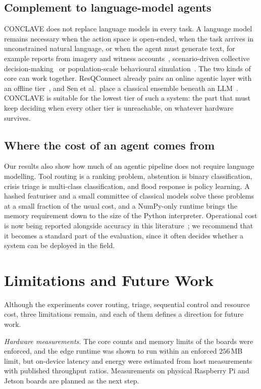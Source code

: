 \documentclass[journal]{IEEEtran}
\begin{document}
\subsection{Complement to language-model agents}
CONCLAVE does not replace language models in every task. A language model
remains necessary when the action space is open-ended, when the task arrives in
unconstrained natural language, or when the agent must generate text, for
example reports from imagery and witness
accounts~\cite{chen2026integration,pang2026reconstruction}, scenario-driven
collective decision-making~\cite{wang2025towards} or population-scale
behavioural simulation~\cite{sultimov2026respond}. The two kinds of core can
work together. ResQConnect already pairs an online agentic layer with an
offline tier~\cite{aththanayake2026resqconnect}, and Sen et al.\ place a
classical ensemble beneath an LLM~\cite{sen2026context}. CONCLAVE is suitable
for the lowest tier of such a system: the part that must keep deciding when
every other tier is unreachable, on whatever hardware survives.

\subsection{Where the cost of an agent comes from}
Our results also show how much of an agentic pipeline does not require
language modelling. Tool routing is a ranking problem, abstention is binary
classification, crisis triage is multi-class classification, and flood
response is policy learning. A hashed featuriser and a small committee of
classical models solve these problems at a small fraction of the usual cost,
and a NumPy-only runtime brings the memory requirement down to the size of the
Python interpreter. Operational cost is now being reported alongside accuracy
in this literature~\cite{yang2025novel}; we recommend that it becomes a
standard part of the evaluation, since it often decides whether a system can
be deployed in the field.

\section{Limitations and Future Work}\label{sec:limits}
Although the experiments cover routing, triage, sequential control and
resource cost, three limitations remain, and each of them defines a direction
for future work.

\textit{Hardware measurements.} The core counts and memory limits of the boards
were enforced, and the edge runtime was shown to run within an enforced
$256$\,MB limit, but on-device latency and energy were estimated from host
measurements with published throughput ratios. Measurements on physical
Raspberry Pi and Jetson boards are planned as the next step.
\end{document}
